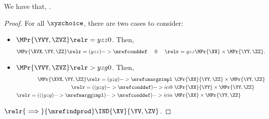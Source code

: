 \begin{proposition}
  We have that, \indcontrdefb.%
\end{proposition}

\begin{proof}
  For all $\xyzchoice$, there are two cases to consider:
  \begin{itemize}
    \item {} $\MPr{\YVY, \ZVZ} \relr = yzz 0$. Then,
      \begin{align*}
        \MPr{\XVX, \YY, \ZZ} \relr = {(yzz)->\mrefconddef} \ \ \ \ 0\ \ \ \  
        \relr = yzz \MPr{\XX}\times \MPr{\YY, \ZZ}.
      \end{align*}
    \item {} $\MPr{\YVY, \ZVZ} \relr > yzg 0$. Then,
      \begin{align*}
        \MPr{\XVX, \YY, \ZZ} \relr = {(yzg)->\mrefcmargzimpl} &\ \CPr{\XX}{\YY, \ZZ} \times \MPr{\YY, \ZZ}\\
        \relr = {((yzg)->\mrefconddef)->icib} &\ \CPr{\XX}{\YY} \times \MPr{\YY, \ZZ}\\
        \relr = {(((yzg)->\mrefmarggimpl)->\mrefconddef)->icia} &\ \MPr{\XX} \times \MPr{\YY, \ZZ}
      \end{align*}
  \end{itemize}
  $\relr {\implies} {\mrefindprod} \IND{\XV}{\YV, \ZV}$.
\end{proof}
